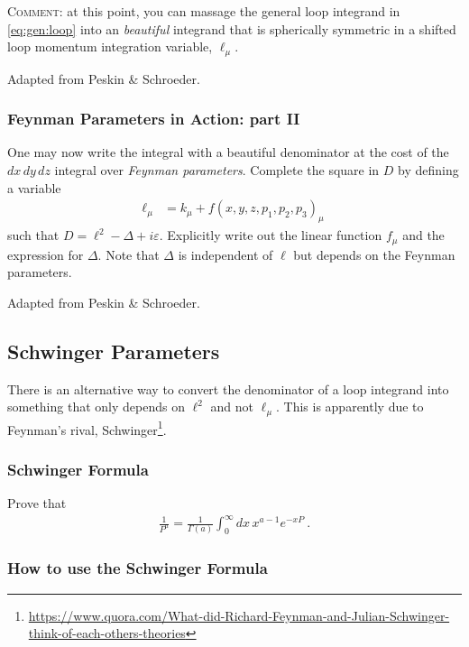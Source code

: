 \documentclass[12pt]{article}
\numberwithin{equation}{subsection}    %
\begin{document}
\textsc{Comment}: at this point, you can massage the general loop integrand in \eqref{eq:gen:loop} into an \emph{beautiful} integrand that is spherically symmetric in a shifted loop momentum integration variable, $\ell_\mu$.

{\footnotesize Adapted from Peskin \& Schroeder.}


\subsubsection{Feynman Parameters in Action: part II}

One may now write the integral with a beautiful denominator at the cost of the $dx\,dy\,dz$ integral over \emph{Feynman parameters}. Complete the square in $D$ by defining a variable
\begin{align}
\ell_\mu &= k_\mu + f(x,y,z,p_1,p_2, p_3)_\mu \ 
\end{align}
such that $D = \ell^2 - \Delta + i\varepsilon$. Explicitly write out the linear function $f_\mu$ and the expression for $\Delta$. Note that $\Delta$ is independent of $\ell$ but depends on the Feynman parameters.



{\footnotesize Adapted from Peskin \& Schroeder.}



\subsection{Schwinger Parameters}

There is an alternative way to convert the denominator of a loop integrand into something that only depends on $\ell^2$ and not $\ell_\mu$. This is apparently due to Feynman's rival, Schwinger\footnote{\url{https://www.quora.com/What-did-Richard-Feynman-and-Julian-Schwinger-think-of-each-others-theories}}. 

\subsubsection{Schwinger Formula}

Prove that
\begin{align}
	\frac{1}{P^a}
	= 
	\frac{1}{\Gamma(a)}
	\int_0^\infty dx\, x^{a-1} e^{-xP} \ .
\end{align}

\subsubsection{How to use the Schwinger Formula}
\end{document}
